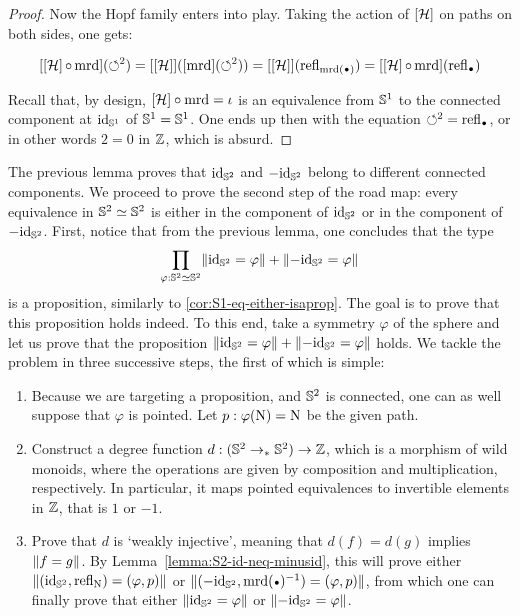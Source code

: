 \documentclass[english,a4paper]{lmcs}
\begin{document}
\begin{proof}
  Now the Hopf family enters into play. Taking the action of $\mathop{\left[{{\mathcal H}}\right]}$ on
  paths on both sides, one gets:

  \begin{displaymath}
    \ap{\ap\hopf\circ \mrd}(\Sloop^2) = \ap{\ap\hopf}(\ap\mrd(\Sloop^2)) =
    \ap{\ap\hopf}(\refl{\mrd(\base)}) = \ap{\ap\hopf\circ \mrd}(\refl{\base})
  \end{displaymath}

  Recall that, by design, ${\mathop{\left[{{\mathcal H}}\right]}}\circ{\operatorname{\mathrm{mrd}}} = \iota$ is an equivalence
  from ${{\mathbb S^{1}}}$ to the connected component at $\mathord{\mathrm{id}}_{{\mathbb S^{1}}}$ of ${{\mathbb S^{1}}}={{\mathbb S^{1}}}$. One ends up
  then with the equation $\Sloop^2 = \refl \base$, or in other words $2=0$ in
  $\mathbb{Z}$, which is absurd.
\end{proof}

The previous lemma proves that $\mathord{\mathrm{id}}_{{\mathbb S^{2}}}$ and $-\mathord{\mathrm{id}}_{{\mathbb S^{2}}}$ belong
to different connected components. We proceed to prove the second step
of the road map: every equivalence in ${{\mathbb S^{2}}} \simeq {{\mathbb S^{2}}}$ is
either in the component of $\mathord{\mathrm{id}}_{{\mathbb S^{2}}}$ or in the component of $-\mathord{\mathrm{id}}_{{\mathbb S^{2}}}$.
First, notice that from the previous lemma, one concludes that the type
\begin{displaymath}
  \prod_{\varphi:{{\mathbb S^{2}}}\simeq{{\mathbb S^{2}}}}\lVert\mathord{\mathrm{id}}_{{\mathbb S^{2}}} = \varphi\rVert + \lVert-\mathord{\mathrm{id}}_{{\mathbb S^{2}}} = \varphi\rVert
\end{displaymath}
is a proposition, similarly to \cref{cor:S1-eq-either-isaprop}.
The goal is to prove that this proposition
holds indeed. To this end, take a symmetry $\varphi$ of the sphere and let us
prove that the proposition $\lVert\mathord{\mathrm{id}}_{{\mathbb S^{2}}} = \varphi\rVert + \lVert-\mathord{\mathrm{id}}_{{\mathbb S^{2}}} =
\varphi\rVert$ holds. We tackle the problem in three successive steps,
the first of which is simple:
\begin{enumerate}
  \item Because we are targeting a proposition, and ${{\mathbb S^{2}}}$ is
    connected, one can as well suppose that $\varphi$ is pointed.
    Let $p:\varphi(\mathrm{N})=\mathrm{N}$ be the given path.
  \item Construct a degree function $d: ({{\mathbb S^{2}}} \to_\ast {{\mathbb S^{2}}}) \to \mathbb{Z}$, which is a
    morphism of wild monoids,
    where the operations are given by composition and multiplication, respectively.
    In particular, it maps pointed equivalences to
    invertible elements in $\mathbb{Z}$, that is $1$ or $-1$.
  \item Prove that $d$ is `weakly injective', meaning that $d(f)=d(g)$
    implies $\lVert f=g\rVert$. By Lemma~\ref{lemma:S2-id-neq-minusid},
    this will prove either $\lVert(\mathord{\mathrm{id}}_{{\mathbb S^{2}}},\mathop{{\mathrm{refl}}_{\mathrm{N}}})=(\varphi,p)\rVert$
    or $\Trunc{(-\id_\Sp,\inv{\mrd(\base)})=(\varphi,p)}$, from which
    one can finally prove that either $\lVert\mathord{\mathrm{id}}_{{\mathbb S^{2}}} = \varphi\rVert$ or
    $\lVert-\mathord{\mathrm{id}}_{{\mathbb S^{2}}} = \varphi\rVert$.\label{it:weakly_injective}
\end{enumerate}
\end{document}
